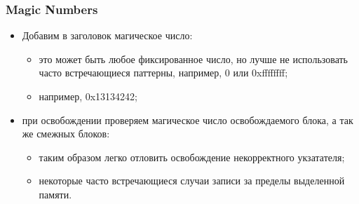 \begin{frame}
\frametitle{Magic Numbers}
\begin{itemize}
  \item Добавим в заголовок магическое число:
  \begin{itemize}
    \item это может быть любое фиксированное число, но лучше не использовать
    часто встречающиеся паттерны, например, 0 или 0xffffffff;
    \item например, 0x13134242;
  \end{itemize}
  \item при освобождении проверяем магическое число освобождаемого блока,
    а так же смежных блоков:
  \begin{itemize}
    \item таким образом легко отловить освобождение некорректного укзатателя;
    \item некоторые часто встречающиеся случаи записи за пределы выделенной
    памяти.
  \end{itemize}
\end{itemize}
\end{frame}
